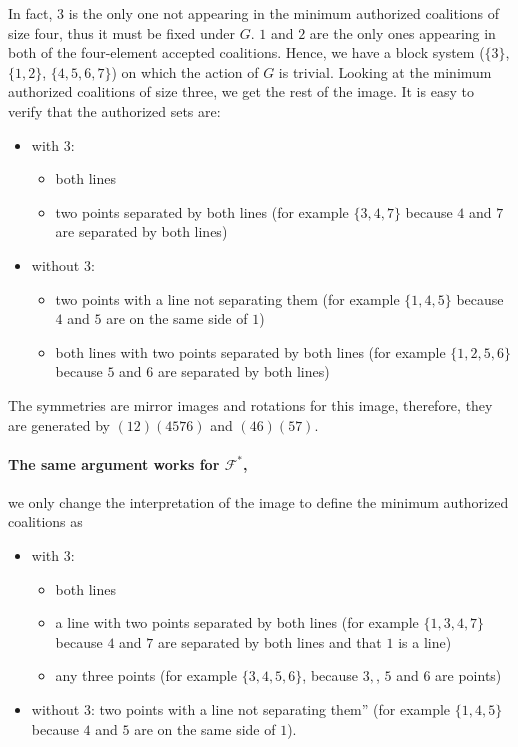 \documentclass[11pt, a4paper]{kybernetika}
\begin{document}
{		In fact, $3$ is the only one not appearing in the minimum authorized coalitions of size four, thus it must be fixed under $G$. $1$ and $2$ are the only ones appearing in both of the four-element accepted coalitions. Hence, we have a block system ($\{3\}$, $\{1,2\}$, $\{4,5,6,7\}$) on which the action of $G$ is trivial. Looking at the minimum authorized coalitions of size three, we get the rest of the image. It is easy to verify that the authorized sets are:
		\begin{itemize}
			\item with $3$:
			\begin{itemize}
				\item both lines
				\item two points separated by both lines (for example $\{3,4,7\}$ because $4$ and $7$ are separated by both lines)
			\end{itemize}
			\item without $3$:
			\begin{itemize}
				\item two points with a line not separating them (for example $\{1,4,5\}$ because $4$ and $5$ are on the same side of $1$)
				\item both lines with two points separated by both lines (for example $\{1,2,5,6\}$ because $5$ and $6$ are separated by both lines)
			\end{itemize}
		\end{itemize}
		The symmetries are mirror images and rotations for this image, therefore, they are generated by $(12)(4576)$ and $(46)(57)$.
		
		\paragraph{The same argument works for $\mathcal{F}^*$,} we only change the interpretation of the image to define the minimum authorized coalitions as
		\begin{itemize}
			\item with $3$:
			\begin{itemize}
				\item both lines
				\item a line with two points separated by both lines (for example $\{1,3,4,7\}$ because $4$ and $7$ are separated by both lines and that $1$ is a line)
				\item any three points (for example $\{3,4,5,6\}$, because $3,$, $5$ and $6$ are points)
			\end{itemize}
			\item without $3$: two points with a line not separating them'' (for example $\{1,4,5\}$ because $4$ and $5$ are on the same side of $1$).
		\end{itemize}
		
}
\end{document}
